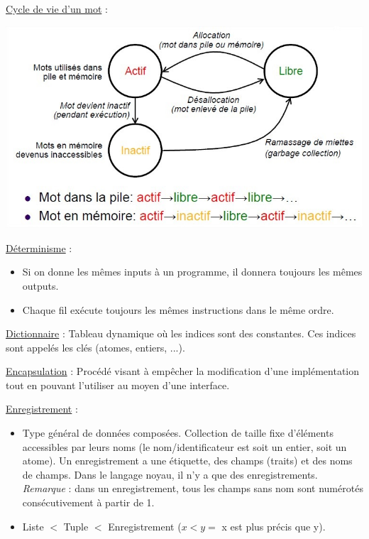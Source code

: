 \documentclass[fr,license=none]{../../../eplsummary}
\begin{document}
\begin{flushleft}
\textcolor{mauvedef}{\underline{Cycle de vie d'un mot}} : 

\begin{center}
\includegraphics[scale=0.5]{CycleVie.jpg}
\end{center}


\textcolor{mauvedef}{\underline{Déterminisme}} : 
\begin{itemize}
\item Si on donne les mêmes inputs à un programme, il donnera toujours les mêmes outputs.
\item Chaque fil exécute toujours les mêmes instructions dans le même ordre.
\end{itemize}
\bigbreak

\textcolor{mauvedef}{\underline{Dictionnaire}} : Tableau dynamique où les indices sont des constantes. Ces indices sont appelés les clés (atomes, entiers, ...). \bigbreak


\textcolor{mauvedef}{\underline{Encapsulation}} : Procédé visant à empêcher la modification d'une implémentation tout en pouvant l'utiliser au moyen d'une interface. \bigbreak



\textcolor{mauvedef}{\underline{Enregistrement}} :

\begin{itemize}
\item Type général de données composées. Collection de taille fixe d’éléments accessibles par leurs noms (le nom/identificateur est soit un entier, soit un atome). Un enregistrement a une étiquette, des champs (traits) et des noms de champs. Dans le langage noyau, il n’y a que des enregistrements. \textit{Remarque} : dans un enregistrement, tous les champs sans nom sont numérotés consécutivement à partir de 1.
\item Liste $<$ Tuple $<$ Enregistrement ($x < y =$ x est plus précis que y).
\end{itemize} \bigbreak




\end{flushleft}
\end{document}
